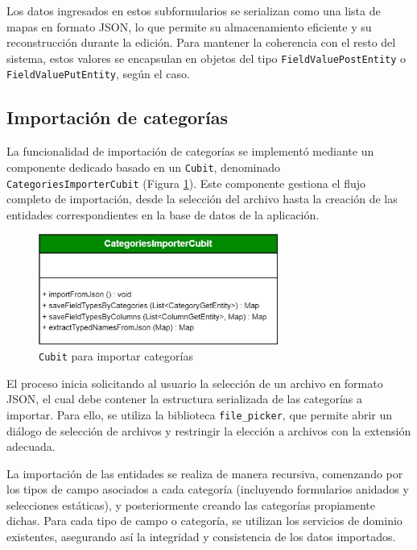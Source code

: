 \documentclass[12pt, a4paper]{book}
\begin{document}
Los datos ingresados en estos subformularios se serializan como una lista de mapas en formato JSON, lo que permite su almacenamiento eficiente y su reconstrucción durante la edición. Para mantener la coherencia con el resto del sistema, estos valores se encapsulan en objetos del tipo \texttt{FieldValuePostEntity} o \texttt{FieldValuePutEntity}, según el caso.


\subsection{Importación de categorías}

La funcionalidad de importación de categorías se implementó mediante un componente dedicado basado en un \texttt{Cubit}, denominado \texttt{CategoriesImporterCubit} (Figura \ref{fig:categoryimporter}). Este componente gestiona el flujo completo de importación, desde la selección del archivo hasta la creación de las entidades correspondientes en la base de datos de la aplicación.

\begin{figure}[H]
  \centering
  \includegraphics[width=0.7\textwidth]{images/category_importer.jpg}
  \caption{\texttt{Cubit} para importar categorías}
  \label{fig:categoryimporter}
\end{figure}

El proceso inicia solicitando al usuario la selección de un archivo en formato JSON, el cual debe contener la estructura serializada de las categorías a importar. Para ello, se utiliza la biblioteca \texttt{file\_picker}, que permite abrir un diálogo de selección de archivos y restringir la elección a archivos con la extensión adecuada.

La importación de las entidades se realiza de manera recursiva, comenzando por los tipos de campo asociados a cada categoría (incluyendo formularios anidados y selecciones estáticas), y posteriormente creando las categorías propiamente dichas. Para cada tipo de campo o categoría, se utilizan los servicios de dominio existentes, asegurando así la integridad y consistencia de los datos importados.
\end{document}

